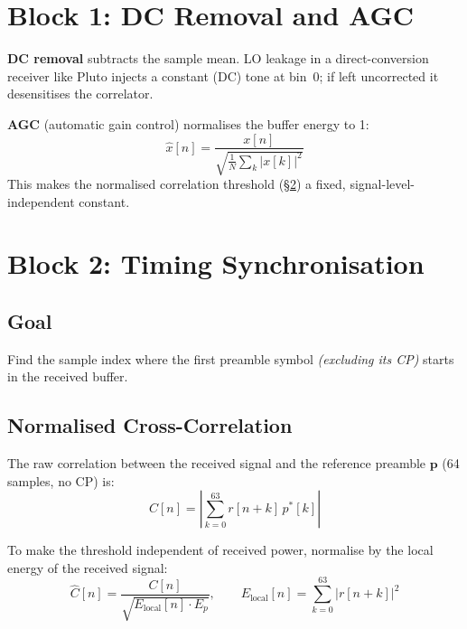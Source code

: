 \documentclass[11pt,a4paper]{article}
\begin{document}
\section{Block 1: DC Removal and AGC}

\textbf{DC removal} subtracts the sample mean.
LO leakage in a direct-conversion receiver like Pluto injects a constant
(DC) tone at bin~0; if left uncorrected it desensitises the correlator.

\textbf{AGC} (automatic gain control) normalises the buffer energy to 1:
\begin{equation}
  \hat{x}[n] = \frac{x[n]}{\sqrt{\frac{1}{N}\sum_k |x[k]|^2}}
\end{equation}
This makes the normalised correlation threshold (\S\ref{sec:timing}) a
fixed, signal-level-independent constant.

\section{Block 2: Timing Synchronisation}
\label{sec:timing}

\subsection{Goal}

Find the sample index where the first preamble symbol \emph{(excluding its CP)}
starts in the received buffer.

\subsection{Normalised Cross-Correlation}

The raw correlation between the received signal and the reference preamble
$\mathbf{p}$ (64 samples, no CP) is:
\begin{equation}
  C[n] = \left|\sum_{k=0}^{63} r[n+k]\, p^*[k]\right|
\end{equation}

To make the threshold independent of received power, normalise by the local
energy of the received signal:
\begin{equation}
  \hat{C}[n] = \frac{C[n]}{\sqrt{E_{\text{local}}[n] \cdot E_p}}, \qquad
  E_{\text{local}}[n] = \sum_{k=0}^{63}|r[n+k]|^2
\end{equation}
\end{document}
